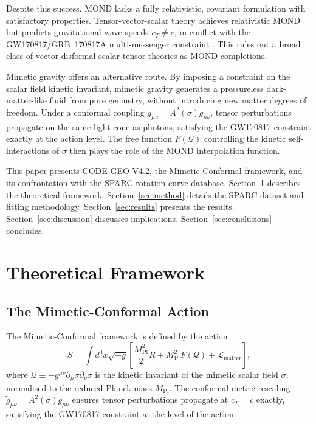 \documentclass{aa}
\newcommand{\Q}{\mathcal{Q}}
\begin{document}
Despite this success, MOND lacks a fully relativistic, covariant formulation
with satisfactory properties. Tensor-vector-scalar theory
\citep[TeVeS;][]{Bekenstein2004} achieves relativistic MOND but predicts
gravitational wave speeds $c_T \neq c$, in conflict with the
GW170817/GRB~170817A multi-messenger constraint \citep{Abbott2017}. This
rules out a broad class of vector-disformal scalar-tensor theories as MOND
completions.

Mimetic gravity \citep{Chamseddine2013} offers an alternative route. By
imposing a constraint on the scalar field kinetic invariant, mimetic gravity
generates a pressureless dark-matter-like fluid from pure geometry, without
introducing new matter degrees of freedom. Under a conformal coupling
$\tilde{g}_{\mu\nu} = A^2(\sigma)g_{\mu\nu}$, tensor perturbations propagate
on the same light-cone as photons, satisfying the GW170817 constraint exactly
at the action level. The free function $F(\Q)$ controlling the kinetic
self-interactions of $\sigma$ then plays the role of the MOND interpolation
function.

This paper presents CODE-GEO V4.2, the Mimetic-Conformal framework, and its
confrontation with the SPARC rotation curve database. Section~\ref{sec:theory}
describes the theoretical framework. Section~\ref{sec:method} details the SPARC
dataset and fitting methodology. Section~\ref{sec:results} presents the results.
Section~\ref{sec:discussion} discusses implications. Section~\ref{sec:conclusions}
concludes.

\section{Theoretical Framework}
\label{sec:theory}

\subsection{The Mimetic-Conformal Action}

The Mimetic-Conformal framework is defined by the action
\begin{equation}
  S = \int d^4x \sqrt{-g} \left[
    \frac{M_\text{Pl}^2}{2} R
    + M_\text{Pl}^2 F(\Q)
    + \mathcal{L}_\text{matter}
  \right],
\end{equation}
where $\Q \equiv -g^{\mu\nu}\partial_\mu\sigma\partial_\nu\sigma$ is the
kinetic invariant of the mimetic scalar field $\sigma$, normalised to the
reduced Planck mass $M_\text{Pl}$. The conformal metric rescaling
$\tilde{g}_{\mu\nu} = A^2(\sigma)g_{\mu\nu}$ ensures tensor perturbations
propagate at $c_T = c$ exactly, satisfying the GW170817 constraint at the
level of the action.
\end{document}
